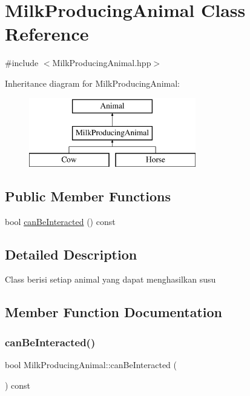 \hypertarget{class_milk_producing_animal}{}\section{Milk\+Producing\+Animal Class Reference}
\label{class_milk_producing_animal}


{\ttfamily \#include $<$Milk\+Producing\+Animal.\+hpp$>$}

Inheritance diagram for Milk\+Producing\+Animal\+:\begin{figure}[H]
\begin{center}
\leavevmode
\includegraphics[height=3.000000cm]{class_milk_producing_animal}
\end{center}
\end{figure}
\subsection*{Public Member Functions}
\begin{DoxyCompactItemize}
\item 
bool \mbox{\hyperlink{class_milk_producing_animal_a944bf91c66a5be0d3918cb71b1a1084b}{can\+Be\+Interacted}} () const
\end{DoxyCompactItemize}


\subsection{Detailed Description}
Class berisi setiap animal yang dapat menghasilkan susu 

\subsection{Member Function Documentation}
\mbox{\label{class_milk_producing_animal_a944bf91c66a5be0d3918cb71b1a1084b}} 
\subsubsection{\texorpdfstring{canBeInteracted()}{canBeInteracted()}}
{\footnotesize\ttfamily bool Milk\+Producing\+Animal\+::can\+Be\+Interacted (\begin{DoxyParamCaption}{ }\end{DoxyParamCaption}) const\hspace{0.3cm}{\ttfamily [virtual]}}

